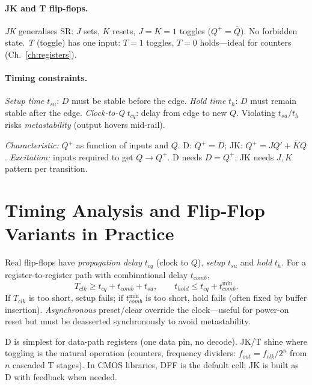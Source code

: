 \paragraph{JK and T flip-flops.} \emph{JK} generalises SR: $J$ sets, $K$ resets, $J=K=1$ toggles
($Q^+=\bar Q$). No forbidden state. \emph{T} (toggle) has one input: $T=1$ toggles, $T=0$ holds---ideal for counters (Ch.~\ref{ch:registers}).

\paragraph{Timing constraints.} \emph{Setup time} $t_{su}$: $D$ must be stable before the edge.
\emph{Hold time} $t_h$: $D$ must remain stable after the edge. \emph{Clock-to-Q} $t_{cq}$: delay from edge to new $Q$.
Violating $t_{su}/t_h$ risks \emph{metastability} (output hovers mid-rail).

\begin{definition}
\emph{Characteristic:} $Q^+$ as function of inputs and $Q$. D: $Q^+=D$; JK: $Q^+=JQ'+\bar KQ$.
\emph{Excitation:} inputs required to get $Q\to Q^+$. D needs $D=Q^+$; JK needs $J,K$ pattern per transition.
\end{definition}


\section{Timing Analysis and Flip-Flop Variants in Practice}
Real flip-flops have \emph{propagation delay} $t_{cq}$ (clock to $Q$), \emph{setup} $t_{su}$ and \emph{hold} $t_h$.
For a register-to-register path with combinational delay $t_{comb}$,
\[ T_{clk} \ge t_{cq}+t_{comb}+t_{su},\qquad t_{hold}\le t_{cq}+t_{comb}^{\min}. \]
If $T_{clk}$ is too short, setup fails; if $t_{comb}^{\min}$ is too short, hold fails (often fixed by buffer insertion).
\emph{Asynchronous} preset/clear override the clock---useful for power-on reset but must be deasserted synchronously to avoid metastability.

\begin{example}
D is simplest for data-path registers (one data pin, no decode). JK/T shine where toggling is the natural operation
(counters, frequency dividers: $f_{out}=f_{clk}/2^n$ from $n$ cascaded T stages). In CMOS libraries, DFF is the default cell;
JK is built as D with feedback when needed.
\end{example}


